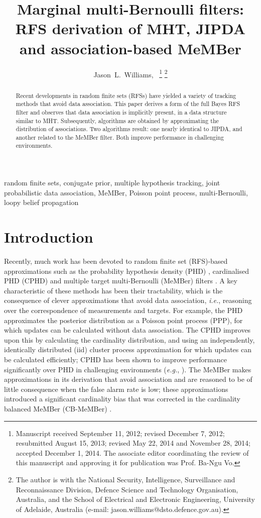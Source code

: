 \documentclass[journal,twoside]{IEEEtran}
\title{Marginal multi-Bernoulli filters: RFS derivation of MHT, JIPDA and association-based MeMBer}
\author{Jason~L.~Williams,~\IEEEmembership{Member,~IEEE}
\thanks{Manuscript received September 11, 2012; revised December 7, 2012; resubmitted August 15, 2013; revised May 22, 2014 and November 28, 2014; accepted December 1, 2014. The associate editor coordinating the review of this manuscript and approving it for publication was Prof. Ba-Ngu Vo.}%
\thanks{The author is with the National Security, Intelligence, Surveillance and Reconnaissance Division, Defence Science and Technology Organisation, Australia, and the School of Electrical and Electronic Engineering, University of Adelaide, Australia (e-mail: jason.williams@dsto.defence.gov.au).}}
\theoremstyle{plain}
\begin{document}
\maketitle
\begin{abstract}
Recent developments in random finite sets (RFSs) have yielded a variety of tracking methods that avoid data association. This paper derives a form of the full Bayes RFS filter and observes that data association is implicitly present, in a data structure similar to MHT. Subsequently, algorithms are obtained by approximating the distribution of associations. Two algorithms result: one nearly identical to JIPDA, and another related to the MeMBer filter. Both improve performance in challenging environments.
\end{abstract}

\begin{keywords}
random finite sets, conjugate prior, multiple hypothesis tracking, joint probabilistic data association, MeMBer, Poisson point process, multi-Bernoulli, loopy belief propagation
\end{keywords}



\section{Introduction}
\label{sec:Introduction}
%
{\noindent}Recently, much work has been devoted to random finite set (RFS)-based approximations such as the probability hypothesis density (PHD) \cite{Mah03,VoMa06}, cardinalised PHD (CPHD) \cite{Mah07b,VoVo07} and multiple target multi-Bernoulli (MeMBer) filters \cite{Mah07,VoVo09}. A key characteristic of these methods has been their tractability, which is the consequence of clever approximations that avoid data association, \textit{i.e.}\xspace, reasoning over the correspondence of measurements and targets. For example, the PHD approximates the posterior distribution as a Poisson point process (PPP), for which updates can be calculated without data association. The CPHD improves upon this by calculating the cardinality distribution, and using an independently, identically distributed (iid) cluster process approximation for which updates can be calculated efficiently; CPHD has been shown to improve performance significantly over PHD in challenging environments (\textit{e.g.}\xspace, \cite{VoVo07}). The MeMBer makes approximations in its derivation that avoid association and are reasoned to be of little consequence when the false alarm rate is low; these approximations introduced a significant cardinality bias that was corrected in the cardinality balanced MeMBer (CB-MeMBer) \cite{VoVo09}. 
\end{document}
